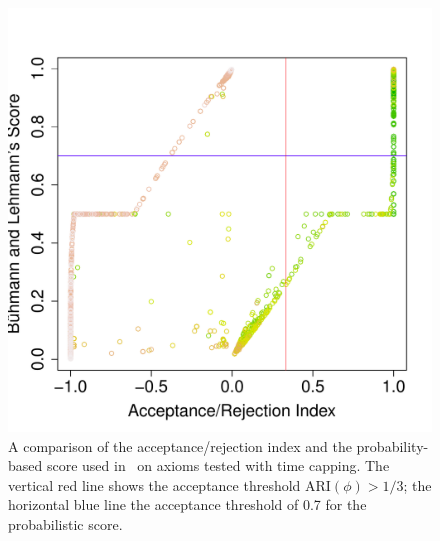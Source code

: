 \documentclass{sig-alternate}
\begin{document}
\begin{figure}[t]
\begin{center}
  \includegraphics[height=\plotheight]{ARI-BLS-dtc}
\end{center}
\caption{A comparison of the acceptance/rejection index and the probability-based
  score used in~\cite{BuehmannLehmann2012} on axioms tested with time capping.
  The vertical red line shows the acceptance threshold $\mathrm{ARI}(\phi)>1/3$;
  the horizontal blue line the acceptance threshold of 0.7 for the probabilistic score.}
\label{fig:ARI-BLS-dtc}
\end{figure}
\end{document}
